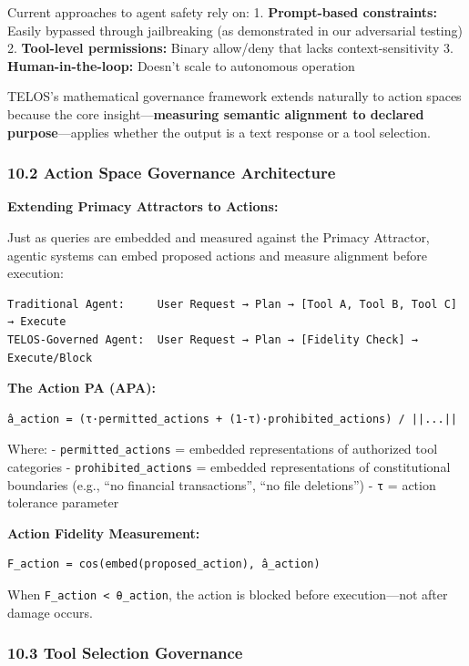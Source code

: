 Current approaches to agent safety rely on: 1. \textbf{Prompt-based
constraints:} Easily bypassed through jailbreaking (as demonstrated in
our adversarial testing) 2. \textbf{Tool-level permissions:} Binary
allow/deny that lacks context-sensitivity 3. \textbf{Human-in-the-loop:}
Doesn't scale to autonomous operation

TELOS's mathematical governance framework extends naturally to action
spaces because the core insight---\textbf{measuring semantic alignment
to declared purpose}---applies whether the output is a text response or
a tool selection.

\subsubsection{10.2 Action Space Governance
Architecture}\label{action-space-governance-architecture}

\textbf{Extending Primacy Attractors to Actions:}

Just as queries are embedded and measured against the Primacy Attractor,
agentic systems can embed proposed actions and measure alignment before
execution:

\begin{verbatim}
Traditional Agent:     User Request → Plan → [Tool A, Tool B, Tool C] → Execute
TELOS-Governed Agent:  User Request → Plan → [Fidelity Check] → Execute/Block
\end{verbatim}

\textbf{The Action PA (APA):}

\begin{verbatim}
â_action = (τ·permitted_actions + (1-τ)·prohibited_actions) / ||...||
\end{verbatim}

Where: - \texttt{permitted\_actions} = embedded representations of
authorized tool categories - \texttt{prohibited\_actions} = embedded
representations of constitutional boundaries (e.g., ``no financial
transactions'', ``no file deletions'') - \texttt{τ} = action tolerance
parameter

\textbf{Action Fidelity Measurement:}

\begin{verbatim}
F_action = cos(embed(proposed_action), â_action)
\end{verbatim}

When \texttt{F\_action\ \textless{}\ θ\_action}, the action is blocked
before execution---not after damage occurs.

\subsubsection{10.3 Tool Selection
Governance}\label{tool-selection-governance}


